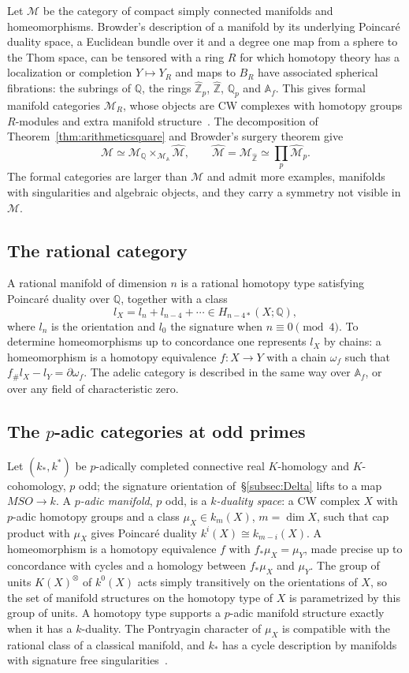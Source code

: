 \documentclass[11pt]{amsart}
\theoremstyle{plain}
\theoremstyle{definition}
\numberwithin{equation}{section}
\newcommand{\Q}{\mathbb{Q}}
\newcommand{\Zhat}{\widehat{\mathbb{Z}}}
\newcommand{\Af}{\mathbb{A}_f}
\begin{document}
Let $\mathcal M$ be the category of compact simply connected manifolds and homeomorphisms.
Browder's description of a manifold by its underlying Poincar\'e duality space, a Euclidean bundle over it and a degree one map from a sphere to the Thom space, can be tensored with a ring $R$ for which homotopy theory has a localization or completion $Y\mapsto Y_R$ and maps to $B_R$ have associated spherical fibrations: the subrings of $\Q$, the rings $\Zhat_p$, $\Zhat$, $\Q_p$ and $\Af$.
This gives formal manifold categories $\mathcal M_R$, whose objects are CW complexes with homotopy groups $R$-modules and extra manifold structure~\cite{SulICM}.
The decomposition of Theorem~\ref{thm:arithmeticsquare} and Browder's surgery theorem give
\[
\mathcal M\simeq\mathcal M_\Q\times_{\mathcal M_{\mathbb A}}\widehat{\mathcal M},\qquad\widehat{\mathcal M}=\mathcal M_{\Zhat}\simeq\prod_p\widehat{\mathcal M}_p .
\]
The formal categories are larger than $\mathcal M$ and admit more examples, manifolds with singularities and algebraic objects, and they carry a symmetry not visible in $\mathcal M$.

\subsection{The rational category}
A rational manifold of dimension $n$ is a rational homotopy type satisfying Poincar\'e duality over $\Q$, together with a class
\[
l_X=l_n+l_{n-4}+\cdots\in H_{n-4*}(X;\Q),
\]
where $l_n$ is the orientation and $l_0$ the signature when $n\equiv0\pmod 4$.
To determine homeomorphisms up to concordance one represents $l_X$ by chains: a homeomorphism is a homotopy equivalence $f\colon X\to Y$ with a chain $\omega_f$ such that $f_\#l_X-l_Y=\partial\omega_f$.
The adelic category is described in the same way over $\Af$, or over any field of characteristic zero.

\subsection{The $p$-adic categories at odd primes}
Let $(k_*,k^*)$ be $p$-adically completed connective real $K$-homology and $K$-cohomology, $p$ odd; the signature orientation of~\S\ref{subsec:Delta} lifts to a map $MSO\to k$.
A \emph{$p$-adic manifold}, $p$ odd, is a \emph{$k$-duality space}: a CW complex $X$ with $p$-adic homotopy groups and a class $\mu_X\in k_m(X)$, $m=\dim X$, such that cap product with $\mu_X$ gives Poincar\'e duality $k^i(X)\cong k_{m-i}(X)$.
A homeomorphism is a homotopy equivalence $f$ with $f_*\mu_X=\mu_Y$, made precise up to concordance with cycles and a homology between $f_*\mu_X$ and $\mu_Y$.
The group of units $K(X)^\otimes$ of $k^0(X)$ acts simply transitively on the orientations of $X$, so the set of manifold structures on the homotopy type of $X$ is parametrized by this group of units.
A homotopy type supports a $p$-adic manifold structure exactly when it has a $k$-duality.
The Pontryagin character of $\mu_X$ is compatible with the rational class of a classical manifold, and $k_*$ has a cycle description by manifolds with signature free singularities~\cite{SulPeriodicity,Siegel}.
\end{document}
